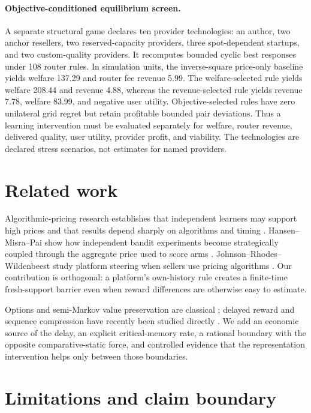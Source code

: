 \documentclass[10pt,twocolumn]{article}
\begin{document}
\paragraph{Objective-conditioned equilibrium screen.}
A separate structural game declares ten provider technologies: an author, two
anchor resellers, two reserved-capacity providers, three spot-dependent
startups, and two custom-quality providers.  It recomputes bounded cyclic best
responses under 108 router rules.  In simulation units, the inverse-square
price-only baseline yields welfare 137.29 and router fee revenue 5.99.  The
welfare-selected rule yields welfare 208.44 and revenue 4.88, whereas the
revenue-selected rule yields revenue 7.78, welfare 83.99, and negative user
utility.  Objective-selected rules have zero unilateral grid regret but retain
profitable bounded pair deviations.  Thus a learning intervention must be
evaluated separately for welfare, router revenue, delivered quality, user
utility, provider profit, and viability.  The technologies are declared stress
scenarios, not estimates for named providers.

\section{Related work}

Algorithmic-pricing research establishes that independent learners may
support high prices and that results depend sharply on algorithms and timing
\citep{calvano2020,asker2022,brownmackay2023}.  Hansen--Misra--Pai show how
independent bandit experiments become strategically coupled through the
aggregate price used to score arms \citep{hansen2021}.  Johnson--Rhodes--
Wildenbeest study platform steering when sellers use pricing algorithms
\citep{johnson2023}.  Our contribution is orthogonal: a platform's own-history
rule creates a finite-time fresh-support barrier even when reward differences
are otherwise easy to estimate.

Options and semi-Markov value preservation are classical
\citep{sutton1999}; delayed reward and sequence compression have recently been
studied directly \citep{han2022,ramesh2024}.  We add an economic source of the
delay, an explicit critical-memory rate, a rational boundary with the opposite
comparative-static force, and controlled evidence that the representation
intervention helps only between those boundaries.

\section{Limitations and claim boundary}
\end{document}
